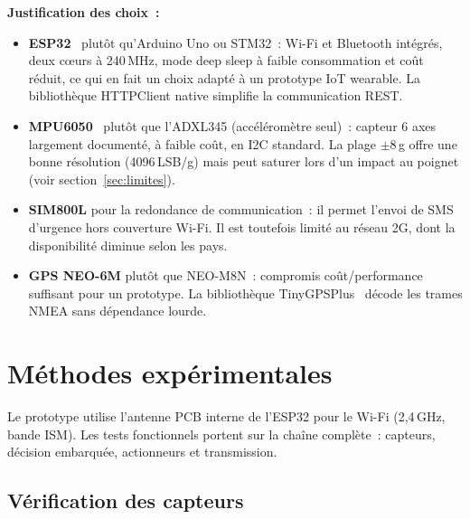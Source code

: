 \documentclass[12pt,a4paper]{article}
\renewcommand{\_}{\textunderscore\allowbreak}
\begin{document}
\textbf{Justification des choix~:}
\begin{itemize}
    \item \textbf{ESP32}~\cite{ref_esp32_datasheet} plutôt qu'Arduino Uno ou STM32~: Wi-Fi et Bluetooth intégrés, deux cœurs à 240\,MHz, mode deep sleep à faible consommation et coût réduit, ce qui en fait un choix adapté à un prototype IoT wearable. La bibliothèque HTTPClient native simplifie la communication REST.

    \item \textbf{MPU6050}~\cite{ref_mpu6050_datasheet} plutôt que l'ADXL345 (accéléromètre seul)~: capteur 6 axes largement documenté, à faible coût, en I2C standard. La plage $\pm$8\,g offre une bonne résolution (4096\,LSB/g) mais peut saturer lors d'un impact au poignet (voir section~\ref{sec:limites}).

    \item \textbf{SIM800L} pour la redondance de communication~: il permet l'envoi de SMS d'urgence hors couverture Wi-Fi. Il est toutefois limité au réseau 2G, dont la disponibilité diminue selon les pays.

    \item \textbf{GPS NEO-6M} plutôt que NEO-M8N~: compromis coût/performance suffisant pour un prototype. La bibliothèque TinyGPSPlus~\cite{ref_tinygps} décode les trames NMEA sans dépendance lourde.
\end{itemize}

\section{Méthodes expérimentales}

Le prototype utilise l'antenne PCB interne de l'ESP32 pour le Wi-Fi (2,4\,GHz, bande ISM). Les tests fonctionnels portent sur la chaîne complète~: capteurs, décision embarquée, actionneurs et transmission.

\subsection{Vérification des capteurs}
\end{document}
